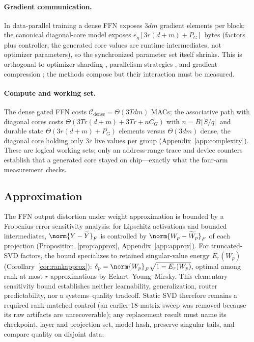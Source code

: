 \paragraph{Gradient communication.}
In data-parallel training a dense FFN exposes $3dm$ gradient elements per
block; the canonical diagonal-core model exposes $e_g[3r(d+m)+P_G]$ bytes
(factors plus controller; the generated core values are runtime
intermediates, not optimizer parameters), so the synchronized parameter set
itself shrinks. This is orthogonal to optimizer sharding
\cite{rajbhandari2020zero}, parallelism strategies
\cite{narayanan2021megatron,korthikanti2023megatron}, and gradient
compression \cite{lin2018dgc,alistarh2017qsgd,vogels2019powersgd}; the
methods compose but their interaction must be measured.

\paragraph{Compute and working set.}
The dense gated FFN costs $\mathcal{C}_{\mathrm{dense}}=\Theta(3Tdm)$ MACs;
the associative path with diagonal cores costs
$\Theta(3Tr(d+m)+3Tr+nC_G)$ with $n=B\lceil S/q\rceil$ and durable state
$\Theta(3r(d+m)+P_G)$ elements versus $\Theta(3dm)$ dense, the diagonal core
holding only $3r$ live values per group (Appendix~\ref{app:complexity}).
These are logical working sets; only an address-range trace and device
counters establish that a generated core stayed on chip---exactly what the
four-arm measurement checks.

\subsection{Approximation}
\label{sec:approx}

The FFN output distortion under weight approximation is bounded by a
Frobenius-error sensitivity analysis: for Lipschitz activations and bounded
intermediates, $\norm{Y-\widetilde{Y}}_F$ is controlled by
$\norm{W_p-\widetilde W_p}_F$ of each projection (Proposition~\ref{prop:approx},
Appendix~\ref{app:approx}). For truncated-SVD factors, the bound specializes
to retained singular-value energy $E_r(W_p)$ (Corollary~\ref{cor:rankapprox}):
$\delta_p=\norm{W_p}_F\sqrt{1-E_r(W_p)}$, optimal among rank-at-most-$r$
approximations by Eckart--Young--Mirsky. This elementary sensitivity bound
establishes neither learnability, generalization, router predictability, nor a
systems--quality tradeoff. Static SVD therefore remains a required
rank-matched control (an earlier 18-matrix sweep was removed because its raw
artifacts are unrecoverable); any replacement result must name its checkpoint,
layer and projection set, model hash, preserve singular tails, and compare
quality on disjoint data.
